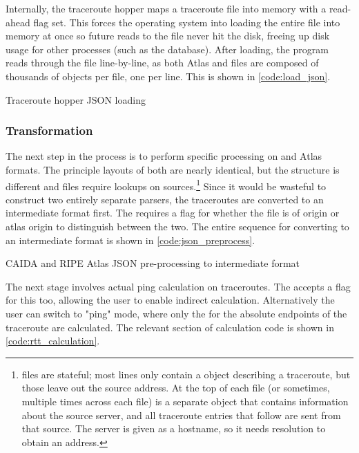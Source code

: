Internally, the traceroute hopper maps a traceroute file into memory with a read-ahead flag set. This forces the operating system into loading the entire file into memory at once so future reads to the file never hit the disk, freeing up disk usage for other processes (such as the database). After loading, the program reads through the file line-by-line, as both \ripe Atlas and \caida \json files are composed of thousands of \json objects per file, one per line. This is shown in \cref{code:load_json}.

\begin{code}[h]
    \caption{Traceroute hopper JSON loading}
    \label{code:load_json}
\end{code}

\subsubsection{Transformation} The next step in the process is to perform specific processing on \caida and \ripe Atlas \json formats. The principle layouts of both are nearly identical, but the structure is different and \caida files require \dns lookups on sources.\footnote{\caida files are stateful; most lines only contain a \json object describing a traceroute, but those leave out the source \ip address. At the top of each file (or sometimes, multiple times across each file) is a separate \json object that contains information about the source server, and all traceroute entries that follow are sent from that source. The server is given as a hostname, so it needs \dns resolution to obtain an \ip address.} Since it would be wasteful to construct two entirely separate parsers, the traceroutes are converted to an intermediate format first. The \cli requires a flag for whether the file is of \caida origin or \ripe atlas origin to distinguish between the two. The entire sequence for converting to an intermediate format is shown in \cref{code:json_preprocess}.

\begin{code}[h]
    \caption{CAIDA and RIPE Atlas JSON pre-processing to intermediate format}
    \label{code:json_preprocess}
\end{code}

The next stage involves actual ping calculation on traceroutes. The \cli accepts a flag for this too, allowing the user to enable indirect calculation. Alternatively the user can switch to "ping" mode, where only the \rtt for the absolute endpoints of the traceroute are calculated. The relevant section of calculation code is shown in \cref{code:rtt_calculation}.

